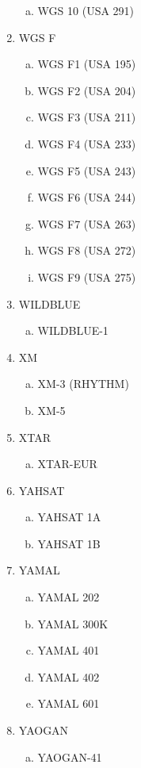 \begin{multicols}{2}
\begin{enumerate}
\begin{enumerate}[a.]
    \item WGS 10 (USA 291)
  \end{enumerate}
  \item WGS F
  \begin{enumerate}[a.]
    \item WGS F1 (USA 195)
    \item WGS F2 (USA 204)
    \item WGS F3 (USA 211)
    \item WGS F4 (USA 233)
    \item WGS F5 (USA 243)
    \item WGS F6 (USA 244)
    \item WGS F7 (USA 263)
    \item WGS F8 (USA 272)
    \item WGS F9 (USA 275)
  \end{enumerate}
  \item WILDBLUE
  \begin{enumerate}[a.]
    \item WILDBLUE-1
  \end{enumerate}
  \item XM
  \begin{enumerate}[a.]
    \item XM-3 (RHYTHM)
    \item XM-5
  \end{enumerate}
  \item XTAR
  \begin{enumerate}[a.]
    \item XTAR-EUR
  \end{enumerate}
  \item YAHSAT
  \begin{enumerate}[a.]
    \item YAHSAT 1A
    \item YAHSAT 1B
  \end{enumerate}
  \item YAMAL
  \begin{enumerate}[a.]
    \item YAMAL 202
    \item YAMAL 300K
    \item YAMAL 401
    \item YAMAL 402
    \item YAMAL 601
  \end{enumerate}
  \item YAOGAN
  \begin{enumerate}[a.]
    \item YAOGAN-41

\end{enumerate}
\end{enumerate}
\end{multicols}
